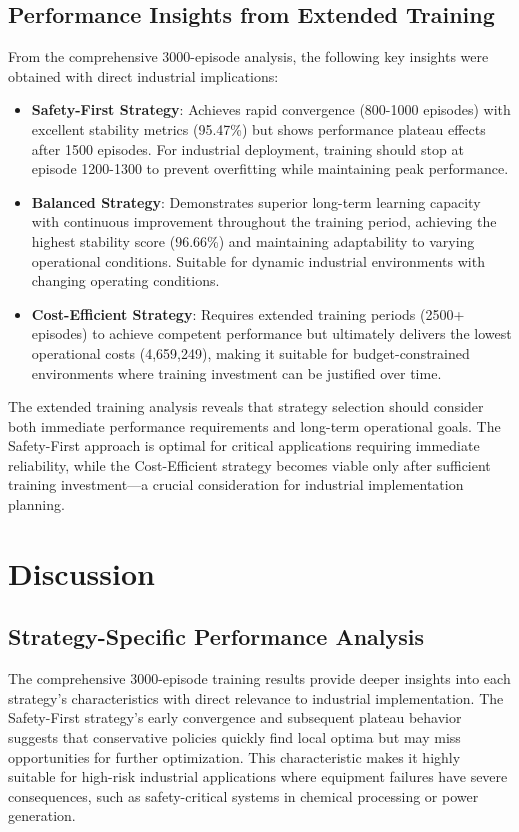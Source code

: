 \documentclass[twocolumn]{article}
\begin{document}
\subsection{Performance Insights from Extended Training}

From the comprehensive 3000-episode analysis, the following key insights were obtained with direct industrial implications:

\begin{itemize}
\item \textbf{Safety-First Strategy}: Achieves rapid convergence (800-1000 episodes) with excellent stability metrics (95.47\%) but shows performance plateau effects after 1500 episodes. For industrial deployment, training should stop at episode 1200-1300 to prevent overfitting while maintaining peak performance.
\item \textbf{Balanced Strategy}: Demonstrates superior long-term learning capacity with continuous improvement throughout the training period, achieving the highest stability score (96.66\%) and maintaining adaptability to varying operational conditions. Suitable for dynamic industrial environments with changing operating conditions.
\item \textbf{Cost-Efficient Strategy}: Requires extended training periods (2500+ episodes) to achieve competent performance but ultimately delivers the lowest operational costs (4,659,249), making it suitable for budget-constrained environments where training investment can be justified over time.
\end{itemize}

The extended training analysis reveals that strategy selection should consider both immediate performance requirements and long-term operational goals. The Safety-First approach is optimal for critical applications requiring immediate reliability, while the Cost-Efficient strategy becomes viable only after sufficient training investment—a crucial consideration for industrial implementation planning.

\section{Discussion}

\subsection{Strategy-Specific Performance Analysis}

The comprehensive 3000-episode training results provide deeper insights into each strategy's characteristics with direct relevance to industrial implementation. The Safety-First strategy's early convergence and subsequent plateau behavior suggests that conservative policies quickly find local optima but may miss opportunities for further optimization. This characteristic makes it highly suitable for high-risk industrial applications where equipment failures have severe consequences, such as safety-critical systems in chemical processing or power generation.
\end{document}
